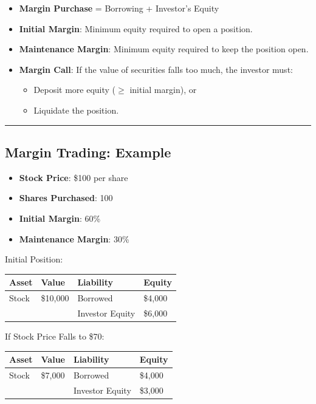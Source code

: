\documentclass[
  letterpaper,
  DIV=11,
  numbers=noendperiod]{scrartcl}
\providecommand{\tightlist}{%
  \setlength{\itemsep}{0pt}\setlength{\parskip}{0pt}}\usepackage{longtable,booktabs,array}
\begin{document}
\begin{itemize}
\tightlist
\item
  \textbf{Margin Purchase} = Borrowing + Investor's Equity
\item
  \textbf{Initial Margin}: Minimum equity required to open a position.
\item
  \textbf{Maintenance Margin}: Minimum equity required to keep the
  position open.
\item
  \textbf{Margin Call}: If the value of securities falls too much, the
  investor must:

  \begin{itemize}
  \tightlist
  \item
    Deposit more equity (\(\ge\) initial margin), or
  \item
    Liquidate the position.
  \end{itemize}
\end{itemize}

\begin{center}\rule{0.5\linewidth}{0.5pt}\end{center}

\subsection{Margin Trading: Example}\label{margin-trading-example}

\begin{itemize}
\tightlist
\item
  \textbf{Stock Price}: \$100 per share
\item
  \textbf{Shares Purchased}: 100
\item
  \textbf{Initial Margin}: 60\%
\item
  \textbf{Maintenance Margin}: 30\%
\end{itemize}

Initial Position:

\begin{longtable}[]{@{}llll@{}}
\toprule\noalign{}
Asset & Value & Liability & Equity \\
\midrule\noalign{}
\endhead
\bottomrule\noalign{}
\endlastfoot
Stock & \$10,000 & Borrowed & \$4,000 \\
& & Investor Equity & \$6,000 \\
\end{longtable}

If Stock Price Falls to \$70:

\begin{longtable}[]{@{}llll@{}}
\toprule\noalign{}
Asset & Value & Liability & Equity \\
\midrule\noalign{}
\endhead
\bottomrule\noalign{}
\endlastfoot
Stock & \$7,000 & Borrowed & \$4,000 \\
& & Investor Equity & \$3,000 \\
\end{longtable}
\end{document}

